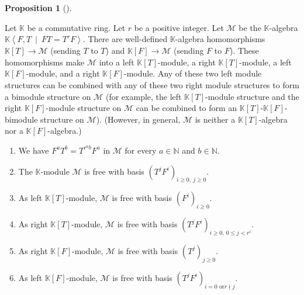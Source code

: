 \documentclass[numbers=enddot,12pt,final,onecolumn,notitlepage]{scrartcl}%
\theoremstyle{definition}
\newtheorem{prop}[theo]{Proposition}
\newenvironment{proposition}[1][]
{\begin{prop}[#1]\begin{leftbar}}
{\end{leftbar}\end{prop}}
\begin{document}
\begin{proposition}
\label{prop.F-gen.bases}Let $\mathbb{K}$ be a commutative ring. Let $r$ be a
positive integer. Let $\mathcal{M}$ be the $\mathbb{K}$-algebra $\mathbb{K}%
\left\langle F,T\ \mid\ FT=T^{r}F\right\rangle $. There are well-defined
$\mathbb{K}$-algebra homomorphisms $\mathbb{K}\left[  T\right]  \rightarrow
\mathcal{M}$ (sending $T$ to $T$) and $\mathbb{K}\left[  F\right]
\rightarrow\mathcal{M}$ (sending $F$ to $F$). These homomorphisms make
$\mathcal{M}$ into a left $\mathbb{K}\left[  T\right]  $-module, a right
$\mathbb{K}\left[  T\right]  $-module, a left $\mathbb{K}\left[  F\right]
$-module, and a right $\mathbb{K}\left[  F\right]  $-module. Any of these two
left module structures can be combined with any of these two right module
structures to form a bimodule structure on $\mathcal{M}$ (for example, the
left $\mathbb{K}\left[  T\right]  $-module structure and the right
$\mathbb{K}\left[  F\right]  $-module structure on $\mathcal{M}$ can be
combined to form an $\mathbb{K}\left[  T\right]  $-$\mathbb{K}\left[
F\right]  $-bimodule structure on $\mathcal{M}$). (However, in general,
$\mathcal{M}$ is neither a $\mathbb{K}\left[  T\right]  $-algebra nor a
$\mathbb{K}\left[  F\right]  $-algebra.)

\begin{enumerate}
\item[\textbf{(a)}] We have $F^{a}T^{b}=T^{r^{a}b}F^{a}$ in $\mathcal{M}$ for
every $a\in\mathbb{N}$ and $b\in\mathbb{N}$.

\item[\textbf{(b)}] The $\mathbb{K}$-module $\mathcal{M}$ is free with basis
$\left(  T^{j}F^{i}\right)  _{i\geq0,\ j\geq0}$.

\item[\textbf{(c)}] As left $\mathbb{K}\left[  T\right]  $-module,
$\mathcal{M}$ is free with basis $\left(  F^{i}\right)  _{i\geq0}$.

\item[\textbf{(d)}] As right $\mathbb{K}\left[  T\right]  $-module,
$\mathcal{M}$ is free with basis $\left(  T^{j}F^{i}\right)  _{i\geq0,\ 0\leq
j<r^{i}}$.

\item[\textbf{(e)}] As right $\mathbb{K}\left[  F\right]  $-module,
$\mathcal{M}$ is free with basis $\left(  T^{j}\right)  _{j\geq0}$.

\item[\textbf{(f)}] As left $\mathbb{K}\left[  F\right]  $-module,
$\mathcal{M}$ is free with basis $\left(  T^{j}F^{i}\right)  _{i=0\text{ or
}r\nmid j}$.


\end{enumerate}
\end{proposition}
\end{document}

